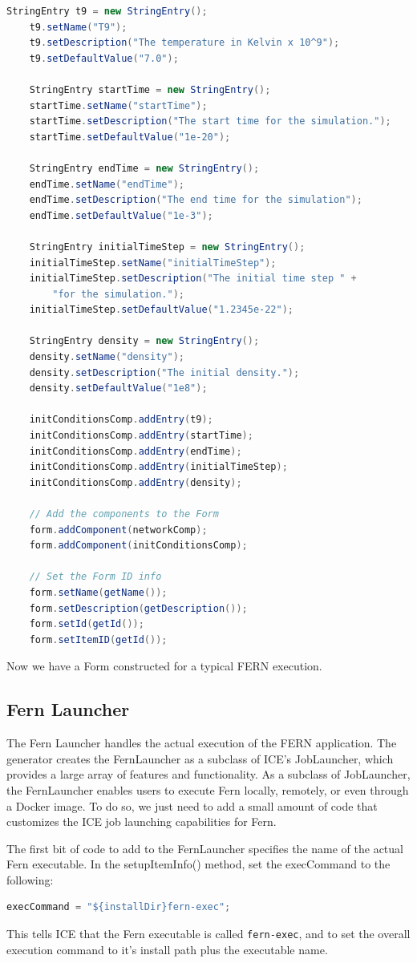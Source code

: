 \begin{lstlisting}[language=Java]
    StringEntry t9 = new StringEntry();
    t9.setName("T9");
    t9.setDescription("The temperature in Kelvin x 10^9");
    t9.setDefaultValue("7.0");

    StringEntry startTime = new StringEntry();
    startTime.setName("startTime");
    startTime.setDescription("The start time for the simulation.");
    startTime.setDefaultValue("1e-20");

    StringEntry endTime = new StringEntry();
    endTime.setName("endTime");
    endTime.setDescription("The end time for the simulation");
    endTime.setDefaultValue("1e-3");

    StringEntry initialTimeStep = new StringEntry();
    initialTimeStep.setName("initialTimeStep");
    initialTimeStep.setDescription("The initial time step " + 
    	"for the simulation."); 
    initialTimeStep.setDefaultValue("1.2345e-22");

    StringEntry density = new StringEntry();
    density.setName("density");
    density.setDescription("The initial density.");
    density.setDefaultValue("1e8");
    
    initConditionsComp.addEntry(t9);
    initConditionsComp.addEntry(startTime);
    initConditionsComp.addEntry(endTime);
    initConditionsComp.addEntry(initialTimeStep);
    initConditionsComp.addEntry(density);
    
    // Add the components to the Form
    form.addComponent(networkComp);    
    form.addComponent(initConditionsComp);
    
    // Set the Form ID info
    form.setName(getName());
    form.setDescription(getDescription());
    form.setId(getId());
    form.setItemID(getId());
\end{lstlisting}

Now we have a Form constructed for a typical FERN execution.

\subsection*{Fern Launcher}
The Fern Launcher handles the actual execution of the FERN application. The
generator creates the FernLauncher as a subclass of ICE's JobLauncher, which
provides a large array of features and functionality. As a subclass of
JobLauncher, the FernLauncher enables users to execute Fern locally, remotely,
or even through a Docker image. To do so, we just need to add a small amount of
code that customizes the ICE job launching capabilities for Fern. 

The first bit of code to add to the FernLauncher specifies the name of the
actual Fern executable. In the setupItemInfo() method, set the execCommand to
the following: 
\begin{lstlisting}[language=Java]
execCommand = "${installDir}fern-exec";
\end{lstlisting}
This tells ICE that the Fern executable is called \texttt{fern-exec}, and to
set the overall execution command to it's install path plus the executable name.

